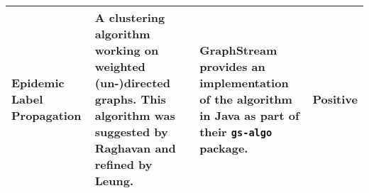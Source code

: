 \begin{table}[H]
\begin{tabular}{|p{60pt}|p{140pt}|p{130pt}|p{70pt}|}
		\hline
		Epidemic Label Propagation & A clustering algorithm working on weighted (un-)directed graphs. This algorithm was suggested by Raghavan\cite{raghavan} and refined by Leung\cite{leung}. & GraphStream\cite{leungGraphstream} provides an implementation of the algorithm in Java as part of their \texttt{gs-algo} package. & Positive \\
		\hline
	\end{tabular}
\end{table}



